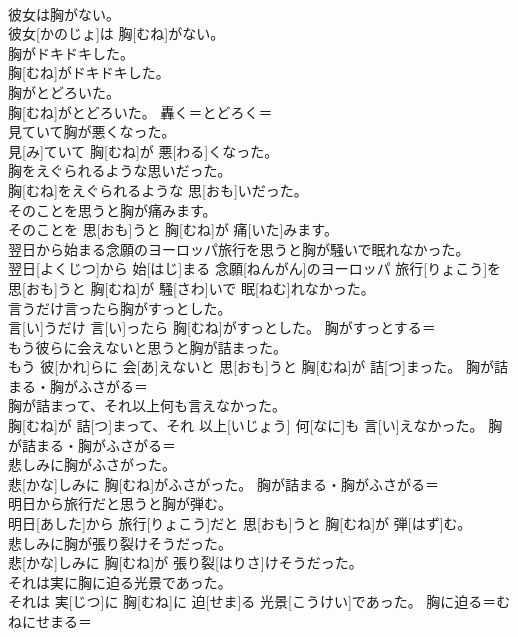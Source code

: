 \documentclass[8pt]{extreport}
\begin{document}
\begin{CJK}{UTF8}{min}
{\\	彼女は胸がない。	
\\	彼女[かのじょ]は 胸[むね]がない。	
\\	胸がドキドキした。	
\\	胸[むね]がドキドキした。	
\\	胸がとどろいた。	
\\	胸[むね]がとどろいた。	轟く＝とどろく＝ 
\\	見ていて胸が悪くなった。	
\\	見[み]ていて 胸[むね]が 悪[わる]くなった。	
\\	胸をえぐられるような思いだった。	
\\	胸[むね]をえぐられるような 思[おも]いだった。	
\\	そのことを思うと胸が痛みます。	
\\	そのことを 思[おも]うと 胸[むね]が 痛[いた]みます。	
\\	翌日から始まる念願のヨーロッパ旅行を思うと胸が騒いで眠れなかった。	
\\	翌日[よくじつ]から 始[はじ]まる 念願[ねんがん]のヨーロッパ 旅行[りょこう]を 思[おも]うと 胸[むね]が 騒[さわ]いで 眠[ねむ]れなかった。	
\\	言うだけ言ったら胸がすっとした。	
\\	言[い]うだけ 言[い]ったら 胸[むね]がすっとした。	胸がすっとする＝ 
\\	もう彼らに会えないと思うと胸が詰まった。	
\\	もう 彼[かれ]らに 会[あ]えないと 思[おも]うと 胸[むね]が 詰[つ]まった。	胸が詰まる・胸がふさがる＝ 
\\	胸が詰まって、それ以上何も言えなかった。	
\\	胸[むね]が 詰[つ]まって、それ 以上[いじょう] 何[なに]も 言[い]えなかった。	胸が詰まる・胸がふさがる＝ 
\\	悲しみに胸がふさがった。	
\\	悲[かな]しみに 胸[むね]がふさがった。	胸が詰まる・胸がふさがる＝ 
\\	明日から旅行だと思うと胸が弾む。	
\\	明日[あした]から 旅行[りょこう]だと 思[おも]うと 胸[むね]が 弾[はず]む。	
\\	悲しみに胸が張り裂けそうだった。	
\\	悲[かな]しみに 胸[むね]が 張り裂[はりさ]けそうだった。	
\\	それは実に胸に迫る光景であった。	
\\	それは 実[じつ]に 胸[むね]に 迫[せま]る 光景[こうけい]であった。	胸に迫る＝むねにせまる＝ 
}
\end{CJK}
\end{document}
